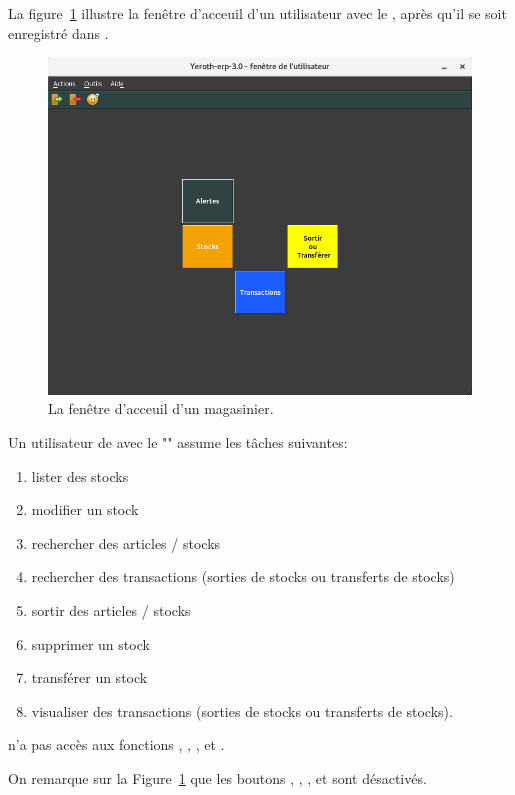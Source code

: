 \label{sec:utilisateurs-lemagasinier}

La figure~\ref{fig:yeren-fenetre-magasinier} illustre
la fen\^etre d'acceuil d'un utilisateur avec le
\role \magasinier, apr\`es qu'il se soit enregistr\'e
dans \yeren.\\

\begin{figure}[!htbp]
\centering
\includegraphics[scale=0.63]{images/yeren-fenetre-magasinier.png}
\caption{La fen\^etre d'acceuil d'un magasinier.}
\label{fig:yeren-fenetre-magasinier}
\end{figure}

Un utilisateur de \yeren avec le \role "\magasinier" assume les
t\^aches suivantes:
\begin{enumerate}[1)]
	\item lister des stocks
	\item modifier un stock
	\item rechercher des articles / stocks
	\item rechercher des transactions 
		(sorties de stocks ou transferts de stocks)
	\item sortir des articles / stocks
	\item supprimer un stock
	\item transf\'erer un stock
	\item visualiser des transactions
	(sorties de stocks ou transferts de stocks).\\
\end{enumerate}

\magasinier n'a pas acc\`es aux fonctions
, ,
, et .

On remarque sur la Figure~\ref{fig:yeren-fenetre-magasinier}
que les boutons , ,
, et  sont d\'esactiv\'es.